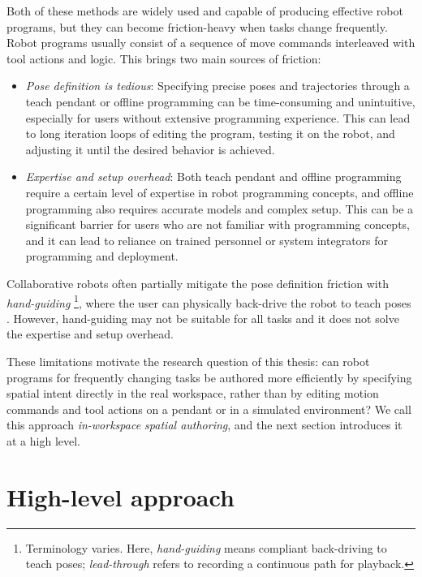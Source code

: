 Both of these methods are widely used and capable of producing effective robot programs, but they can become friction-heavy when tasks change frequently. Robot programs usually consist of a sequence of move commands interleaved with tool actions and logic. This brings two main sources of friction:
\begin{itemize}
    \item \emph{Pose definition is tedious}: Specifying precise poses and trajectories through a teach pendant or offline programming can be time-consuming and unintuitive, especially for users without extensive programming experience. This can lead to long iteration loops of editing the program, testing it on the robot, and adjusting it until the desired behavior is achieved.
    \item \emph{Expertise and setup overhead}: Both teach pendant and offline programming require a certain level of expertise in robot programming concepts, and offline programming also requires accurate models and complex setup. This can be a significant barrier for users who are not familiar with programming concepts, and it can lead to reliance on trained personnel or system integrators for programming and deployment.
\end{itemize}

Collaborative robots often partially mitigate the pose definition friction with \emph{hand-guiding} \footnote{Terminology varies. Here, \emph{hand-guiding} means compliant back-driving to teach poses; \emph{lead-through} refers to recording a continuous path for playback.}, where the user can physically back-drive the robot to teach poses \cite{KassowRobotsManuals}. However, hand-guiding may not be suitable for all tasks and it does not solve the expertise and setup overhead.

These limitations motivate the research question of this thesis: can robot programs for frequently changing tasks be authored more efficiently by specifying spatial intent directly in the real workspace, rather than by editing motion commands and tool actions on a pendant or in a simulated environment? We call this approach \emph{in-workspace spatial authoring}, and the next section introduces it at a high level.


\section*{High-level approach}

